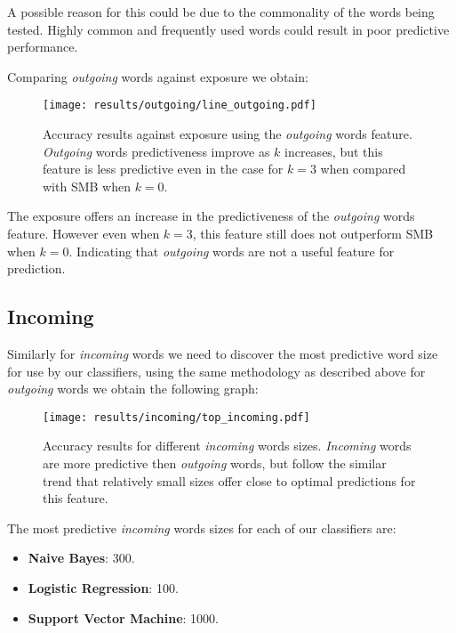 A possible reason for this could be due to the commonality of the words being tested. Highly common and frequently used words could 
result in poor predictive performance.

\clearpage

Comparing \emph{outgoing} words against exposure we obtain:

\begin{figure}[h]
	\begin{center}
		\texttt{[image: results/outgoing/line\_outgoing.pdf]}
		\caption{Accuracy results against exposure using the \emph{outgoing} words feature. \emph{Outgoing} words predictiveness improve as $k$ increases, but this feature is less predictive
				 even in the case for $k=3$ when compared with SMB when $k=0$.}
	\end{center}
\end{figure}

The exposure offers an increase in the predictiveness of the \emph{outgoing} words feature. However even when $k=3$, this feature still does 
not outperform SMB when $k=0$. Indicating that \emph{outgoing} words are not a useful feature for prediction.

\subsection{Incoming}
\label{sec:id}

Similarly for \emph{incoming} words we need to discover the most predictive word size for use by our classifiers, 
using the same methodology as described above for \emph{outgoing} words we obtain the following graph:

\begin{figure}[h]
	\begin{center}
		\texttt{[image: results/incoming/top\_incoming.pdf]}
		\caption{Accuracy results for different \emph{incoming} words sizes. \emph{Incoming} words are more predictive then \emph{outgoing} words, but follow
				 the similar trend that relatively small sizes offer close to optimal predictions for this feature.}
	\end{center}
\end{figure}

\clearpage

The most predictive \emph{incoming} words sizes for each of our classifiers are:
\begin{itemize}
\item \textbf{Naive Bayes}: 300.
\item \textbf{Logistic Regression}: 100.
\item \textbf{Support Vector Machine}: 1000.
\end{itemize}

